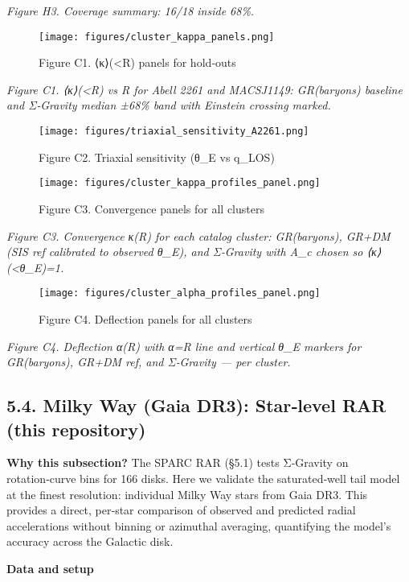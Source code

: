 \documentclass[11pt,a4paper]{article}
\begin{document}
\textit{Figure H3. Coverage summary: 16/18 inside 68\%.}


\begin{figure}[h]
\centering
\texttt{[image: figures/cluster\_kappa\_panels.png]}
\caption{Figure C1. ⟨κ⟩(<R) panels for hold‑outs}
\end{figure}


\textit{Figure C1. ⟨κ⟩(<R) vs R for Abell 2261 and MACSJ1149: GR(baryons) baseline and Σ‑Gravity median ±68\% band with Einstein crossing marked.}


\begin{figure}[h]
\centering
\texttt{[image: figures/triaxial\_sensitivity\_A2261.png]}
\caption{Figure C2. Triaxial sensitivity (θ_E vs q_LOS)}
\end{figure}


\begin{figure}[h]
\centering
\texttt{[image: figures/cluster\_kappa\_profiles\_panel.png]}
\caption{Figure C3. Convergence panels for all clusters}
\end{figure}


\textit{Figure C3. Convergence κ(R) for each catalog cluster: GR(baryons), GR+DM (SIS ref calibrated to observed θ\_E), and Σ‑Gravity with A\_c chosen so ⟨κ⟩(<θ\_E)=1.}


\begin{figure}[h]
\centering
\texttt{[image: figures/cluster\_alpha\_profiles\_panel.png]}
\caption{Figure C4. Deflection panels for all clusters}
\end{figure}


\textit{Figure C4. Deflection α(R) with α=R line and vertical θ\_E markers for GR(baryons), GR+DM ref, and Σ‑Gravity — per cluster.}


\subsection{5.4. Milky Way (Gaia DR3): Star‑level RAR (this repository)}


\textbf{Why this subsection?} The SPARC RAR (§5.1) tests Σ‑Gravity on rotation‑curve bins for 166 disks. Here we validate the saturated‑well tail model at the finest resolution: individual Milky Way stars from Gaia DR3. This provides a direct, per‑star comparison of observed and predicted radial accelerations without binning or azimuthal averaging, quantifying the model's accuracy across the Galactic disk.


\textbf{Data and setup}
\end{document}

